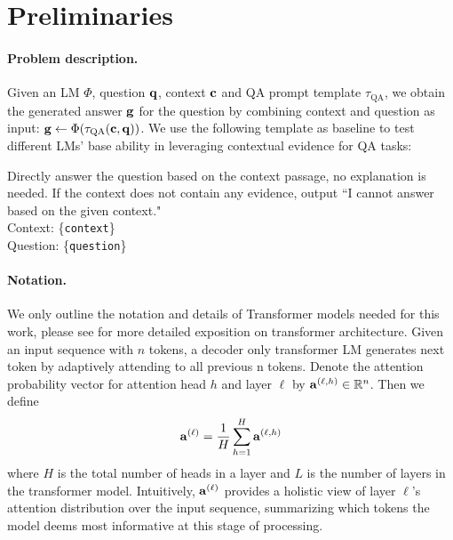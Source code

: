 \section{Preliminaries}\label{sec:bac}
\paragraph{Problem description.}

Given an LM $\Phi$, question ${\mathbf{q}}$, context ${\mathbf{c}}$ and QA prompt template $\tau_\text{QA}$, we obtain the generated answer ${\mathbf{g}}$ for the question by combining context and question as input: ${\mathbf{g}} \gets \Phi(\tau_\text{QA}({\mathbf{c}}, {\mathbf{q}}))$.
We use the following template as baseline to test different LMs' base ability in leveraging contextual evidence for QA tasks:
\begin{tcolorbox}[title={\footnotesize A direct prompt template $\tau_\texttt{QA}$ for context-based QA},top=1mm,bottom=1mm]
\scriptsize
Directly answer the question based on the context passage, no explanation is needed. If the context does not contain any evidence, output ``I cannot answer based on the given context."\\
Context: \{\texttt{context}\}\\
Question: \{\texttt{question}\}
\end{tcolorbox}

\paragraph{Notation.}
We only outline the notation and details of Transformer models needed for this work, please see \cite{transformers2017} for more detailed exposition on transformer architecture. Given an input sequence with $n$ tokens, a decoder only transformer LM generates next token by adaptively attending to all previous n tokens. Denote the attention probability vector for attention head $h$ and layer $\ell$ by ${\mathbf{a}}^{(\ell,h)}\in \mathbb{R}^n$. Then we define
\begin{equation}
\label{eq:att-layer}
{\mathbf{a}}^{(\ell)} = \frac{1}{H}\sum\limits_{h=1}^{H} {\mathbf{a}}^{(\ell, h)}
\end{equation}
where $H$ is the total number of heads in a layer and $L$ is the number of layers in the transformer model. Intuitively, ${\mathbf{a}}^{(\ell)}$ provides a holistic view of layer $\ell$'s attention distribution over the input sequence, summarizing which tokens the model deems most informative at this stage of processing.